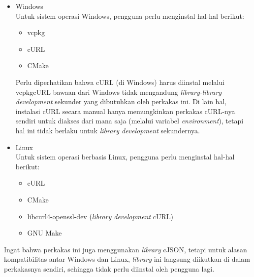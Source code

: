 \begin{itemize}
	\item Windows \\
	Untuk sistem operasi Windows, pengguna perlu menginstal hal-hal berikut:
	
	\begin{itemize}
		\item vcpkg
		\item cURL
		\item CMake
	\end{itemize}
	
	Perlu diperhatikan bahwa cURL (di Windows) harus diinstal melalui vcpkg\textemdash cURL bawaan dari Windows tidak mengandung \textit{library-library development} sekunder yang dibutuhkan oleh perkakas ini. Di lain hal, instalasi cURL secara manual hanya memungkinkan perkakas cURL-nya sendiri untuk diakses dari mana saja (melalui variabel \textit{environment}), tetapi hal ini tidak berlaku untuk \textit{library development} sekundernya.
	
	\item Linux \\
	Untuk sistem operasi berbasis Linux, pengguna perlu menginstal hal-hal berikut:
	
	\begin{itemize}
		\item cURL
		\item CMake
		\item libcurl4-openssl-dev (\textit{library development} cURL)
		\item GNU Make
	\end{itemize}
	
\end{itemize}

Ingat bahwa perkakas ini juga menggunakan \textit{library} cJSON, tetapi untuk alasan kompatibilitas antar Windows dan Linux, \textit{library} ini langsung diikutkan di dalam perkakasnya sendiri, sehingga tidak perlu diinstal oleh pengguna lagi.

